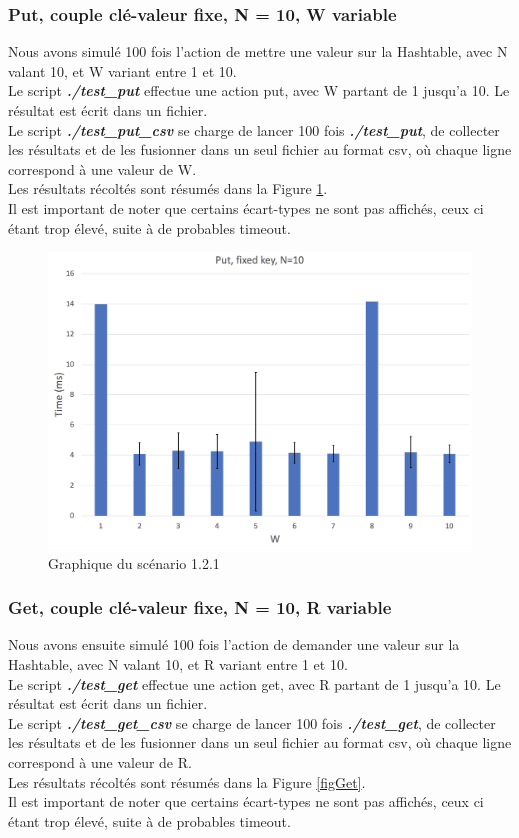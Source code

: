\documentclass{article}
\begin{document}
\subsubsection{Put, couple clé-valeur fixe, N = 10, W variable}
Nous avons simulé 100 fois l'action de mettre une valeur sur la Hashtable, avec N valant 10, et W variant entre 1 et 10.\\
Le script \textbf{\textit{./test\_put}} effectue une action put, avec W partant de 1 jusqu'a 10. Le résultat est écrit dans un fichier. \\
Le script \textbf{\textit{./test\_put\_csv}} se charge de lancer 100 fois \textbf{\textit{./test\_put}}, de collecter les résultats et de les fusionner dans un seul fichier au format csv, où chaque ligne correspond à une valeur de W. \\
Les résultats récoltés sont résumés dans la Figure \ref{figPut}. \\
Il est important de noter que certains écart-types ne sont pas affichés, ceux ci étant trop élevé, suite à de probables timeout.
\begin{figure}
 	\includegraphics[scale = 0.25]{img/Put}
 	\caption{Graphique du scénario 1.2.1}
 	\label{figPut}
\end{figure}

\subsubsection{Get, couple clé-valeur fixe, N = 10, R variable}
Nous avons ensuite simulé 100 fois l'action de demander une valeur sur la Hashtable, avec N valant 10, et R variant entre 1 et 10.\\
Le script \textbf{\textit{./test\_get}} effectue une action get, avec R partant de 1 jusqu'a 10. Le résultat est écrit dans un fichier. \\
Le script \textbf{\textit{./test\_get\_csv}} se charge de lancer 100 fois \textbf{\textit{./test\_get}}, de collecter les résultats et de les fusionner dans un seul fichier au format csv, où chaque ligne correspond à une valeur de R. \\
Les résultats récoltés sont résumés dans la Figure \ref{figGet}. \\
Il est important de noter que certains écart-types ne sont pas affichés, ceux ci étant trop élevé, suite à de probables timeout.
\end{document}
